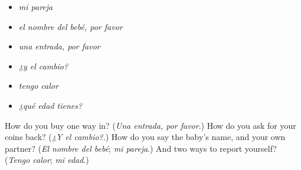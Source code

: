 \begin{itemize}
\raggedright
  \item \emph{mi pareja}
  \item \emph{el nombre del bebé, por favor}
  \item \emph{una entrada, por favor}
  \item \emph{¿y el cambio?}
  \item \emph{tengo calor}
  \item \emph{¿qué edad tienes?}
\end{itemize}

\begin{tcolorbox}[breakable,colback=teal!4,colframe=teal!35!black,title={Before you move on}]
How do you buy one way in? (\emph{Una entrada, por favor}.) How do you ask for your coins back? (\emph{¿Y el cambio?}.) How do you say the baby's name, and your own partner? (\emph{El nombre del bebé}; \emph{mi pareja}.) And two ways to report yourself? (\emph{Tengo calor}; \emph{mi edad}.)
\end{tcolorbox}
